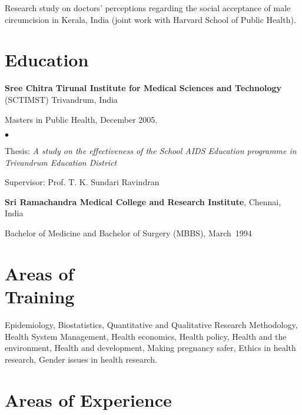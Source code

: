 \documentclass[margin,line]{res}
\newenvironment{list1}{
  \begin{list}{\ding{113}}{%
      \setlength{\itemsep}{0in}
      \setlength{\parsep}{0in} \setlength{\parskip}{0in}
      \setlength{\topsep}{0in} \setlength{\partopsep}{0in} 
      \setlength{\leftmargin}{0.17in}}}{\end{list}}
\newenvironment{list2}{
  \begin{list}{$\bullet$}{%
      \setlength{\itemsep}{0in}
      \setlength{\parsep}{0in} \setlength{\parskip}{0in}
      \setlength{\topsep}{0in} \setlength{\partopsep}{0in} 
      \setlength{\leftmargin}{0.2in}}}{\end{list}}
\begin{document}
\begin{resume}
Research study on doctors' perceptions regarding the
      social acceptance of male circumcision in Kerala,
      India (joint work with Harvard School of Public Health).

\section{\sc Education}

{\bf Sree Chitra Tirunal Institute for Medical Sciences and
Technology\/} (SCTIMST) Trivandrum, India\\

\vspace*{-.1in}
\begin{list1}
\item[] Masters in Public Health, December  2005.  
\begin{list2}
\vspace*{.05in}
\item Thesis:  \emph{A study on the effectiveness of the School AIDS
Education programme in Trivandrum Education District\/}
\item Supervisor:  Prof. T. K. Sundari Ravindran
\end{list2}
\end{list1}

{\bf Sri Ramachandra Medical College and Research Institute}, Chennai, India\\
\vspace*{-.1in}
\begin{list1}
\item[] Bachelor of Medicine and Bachelor of Surgery (MBBS),  March~1994
\end{list1}

\section{\sc Areas of\\ Training}
Epidemiology, Biostatistics, Quantitative and Qualitative
Research Methodology, Health System Management, Health
economics, Health policy, Health and the environment,
Health and development, Making pregnancy safer, Ethics in
health research, Gender issues in health research.

\section{\sc Areas of Experience}


\end{resume}
\end{document}
